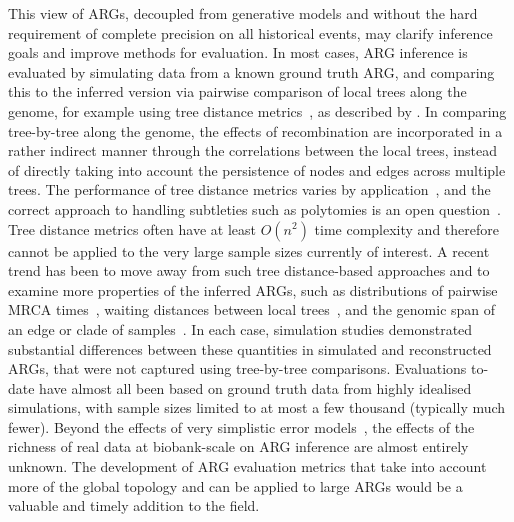 \documentclass{article}
\begin{document}
This view of ARGs,
decoupled from generative models and
without the hard requirement
of complete precision on all historical events, may clarify inference goals and improve
methods for evaluation.
In most cases,
ARG inference is evaluated by simulating data from a known ground truth ARG,
and comparing this to the inferred version via pairwise comparison of
local trees along the genome, for example
using tree distance
metrics~\citep[e.g.][]{robinson1981comparison,kendall2016mapping},
as described by \citet{kuhner2015assessing}.
In comparing tree-by-tree along the genome, the effects of recombination
are incorporated in a rather indirect manner through the correlations
between the local trees, instead of directly taking into account
the persistence of nodes and edges across multiple trees.
The performance of tree distance metrics varies by
application~\citep{kuhner2015assessing}, and the correct approach
to handling subtleties such as polytomies
is an open question~\citep{kelleher2019inferring,zhang2023biobank}.
Tree distance metrics often have at least $O(n^2)$ time complexity
and therefore cannot be
applied to the very large sample sizes currently of interest.
A recent trend has been to move away from such
tree distance-based approaches and to examine more
properties of the inferred ARGs, such as
distributions of pairwise MRCA times~\citep{brandt2021evaluation},
waiting distances between local trees~\citep{deng2021distribution},
and the genomic span of an edge or clade of
samples~\citep{ignatieva2023distribution}.
In each case, simulation studies demonstrated
substantial differences between these quantities in simulated and reconstructed ARGs,
that were not captured using tree-by-tree comparisons.
Evaluations to-date have almost all been based
on ground truth data from highly idealised simulations,
with sample sizes limited to at most a few thousand (typically much fewer).
Beyond the effects of very simplistic error models~\cite[e.g.][]{kelleher2019inferring},
the effects of the richness of real data
at biobank-scale on ARG inference are almost entirely unknown.
The development of ARG evaluation metrics that take into account more of the
global topology and can be applied to large ARGs would be a
valuable and timely addition to the field.
\end{document}
